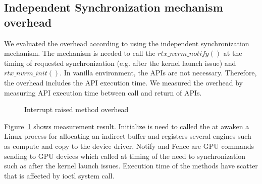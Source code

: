 \subsection{Independent Synchronization mechanism overhead}
We evaluated the overhead according to using the independent synchronization mechanism.
The mechanism is needed to call the $rtx\_nvrm\_notify()$ at the timing of requested synchronization (e.g. after the kernel launch issue) and $rtx\_nvrm\_init()$.
In vanilla environment, the APIs are not necessary.
Therefore, the overhead includes the API execution time.
We measured the overhead by measuring API execution time between call and return of APIs.

\begin{figure}[!t]
\begin{center}
\caption{Interrupt raised method overhead}
\label{fig:irq_rise_overhead}
\end{center}
\end{figure}

Figure~\ref{fig:irq_rise_overhead} shows measurement result.
Initialize is need to called the at awaken a Linux process for allocating an indirect buffer and registers several engines such as compute and copy to the device driver.
Notify and Fence are GPU commands sending to GPU devices which called at timing of the need to synchronization such as after the kernel launch issues.
Execution time of the methods have scatter that is affected by ioctl system call.

